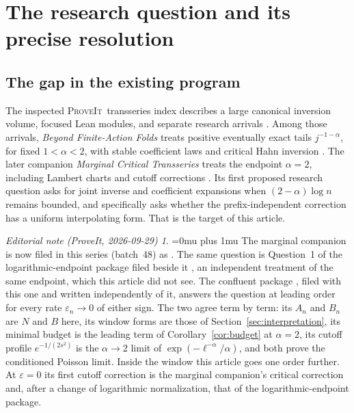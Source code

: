 \documentclass[11pt,a4paper]{article}
\numberwithin{equation}{section}
\theoremstyle{definition}
\theoremstyle{remark}
\newtheorem*{ednoteinner}{Editorial note (ProveIt, 2026-09-29)}
\newenvironment{ednote}{\begin{ednoteinner}\sloppy\Urlmuskip=0mu plus 1mu\relax}{\end{ednoteinner}}
\newcommand{\eps}{\varepsilon}
\newcommand{\repo}{\textsc{ProveIt}}
\begin{document}
\section{The research question and its precise resolution}
\label{sec:intro}

\subsection{The gap in the existing program}
The inspected \repo\ transseries index describes a large canonical inversion
volume, focused Lean modules, and separate research arrivals
\cite{repo-index,repo-readme}. Among those arrivals,
\emph{Beyond Finite-Action Folds} treats positive eventually exact tails
\(j^{-1-\alpha}\), for fixed \(1<\alpha<2\), with stable coefficient laws and
critical Hahn inversion \cite{repo-stable}. The later companion
\emph{Marginal Critical Transseries} treats the endpoint \(\alpha=2\), including
Lambert charts and cutoff corrections \cite{marginal}.
Its first proposed research question asks for joint inverse and coefficient
expansions when \((2-\alpha)\log n\) remains bounded, and specifically asks
whether the prefix-independent correction has a uniform interpolating form.
That is the target of this article.
\begin{ednote}
The marginal companion is now filed in this series (batch~48) as
. The same question is
Question~1 of the logarithmic-endpoint package filed beside it
\cite{ed:lce}, an independent treatment of the same endpoint, which this
article did not see. The confluent package \cite{ed:cct}, filed with this
one and written independently of it, answers the question at leading order
for every rate \(\eps_n\to0\) of either sign. The two agree term by term:
its \(A_n\) and \(B_n\) are \(N\) and \(B\) here, its window forms are
those of Section~\ref{sec:interpretation}, its minimal budget is the
leading term of Corollary~\ref{cor:budget} at \(\alpha=2\), its cutoff profile
\(e^{-1/(2s^2)}\) is the \(\alpha\to2\) limit of \(\exp(-\ell^{-\alpha}/\alpha)\),
and both prove the conditioned Poisson limit. Inside the window this article
goes one order further. At \(\eps=0\) its first cutoff correction is the
marginal companion's critical correction and, after a change of
logarithmic normalization, that of the logarithmic-endpoint package.
\end{ednote}
\end{document}
